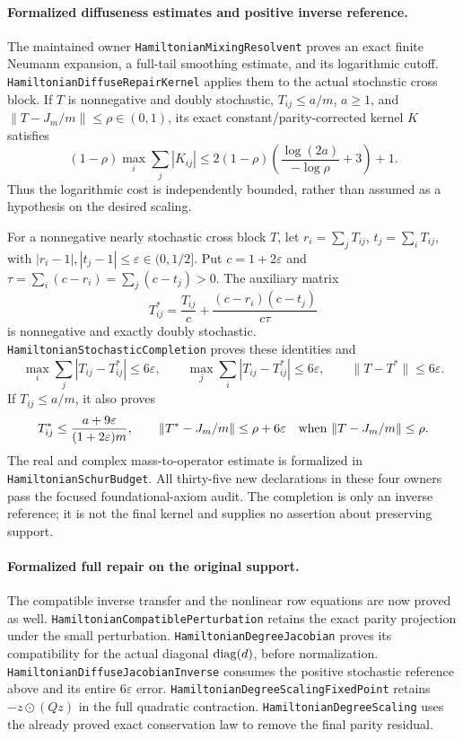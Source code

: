 \paragraph{Formalized diffuseness estimates and positive inverse reference.}
The maintained owner \texttt{HamiltonianMixingResolvent} proves
an exact finite Neumann expansion, a full-tail smoothing estimate,
and its logarithmic cutoff.
\texttt{HamiltonianDiffuseRepairKernel} applies them to the actual
stochastic cross block. If \(T\) is nonnegative and doubly stochastic,
\(T_{ij}\leq a/m\), \(a\geq1\), and
\(\|T-J_m/m\|\leq\rho\in(0,1)\), its exact
constant/parity-corrected kernel \(K\) satisfies
\[
 (1-\rho)\max_i\sum_j|K_{ij}|
 \leq
 2(1-\rho)\left(\frac{\log(2a)}{-\log\rho}+3\right)+1.
\]
Thus the logarithmic cost is independently bounded, rather than
assumed as a hypothesis on the desired scaling.

For a nonnegative nearly stochastic cross block \(T\), let
\(r_i=\sum_jT_{ij}\), \(t_j=\sum_iT_{ij}\), with
\(|r_i-1|,|t_j-1|\leq\varepsilon\in(0,1/2]\).
Put \(c=1+2\varepsilon\) and
\(\tau=\sum_i(c-r_i)=\sum_j(c-t_j)>0\). The auxiliary matrix
\[
 T^*_{ij}=\frac{T_{ij}}c+
               \frac{(c-r_i)(c-t_j)}{c\tau}
\]
is nonnegative and exactly doubly stochastic.
\texttt{HamiltonianStochasticCompletion} proves these identities and
\[
 \max_i\sum_j|T_{ij}-T^*_{ij}|\leq6\varepsilon,\qquad
 \max_j\sum_i|T_{ij}-T^*_{ij}|\leq6\varepsilon,\qquad
 \|T-T^*\|\leq6\varepsilon .
\]
If \(T_{ij}\leq a/m\), it also proves
\[
 T^*_{ij}\leq\frac{a+9\varepsilon}{(1+2\varepsilon)m},
 \qquad
 \|T^*-J_m/m\|\leq\rho+6\varepsilon
 \quad\hbox{when }\|T-J_m/m\|\leq\rho.
\]
The real and complex mass-to-operator estimate is formalized in
\texttt{HamiltonianSchurBudget}.
All thirty-five new declarations in these four owners pass the
focused foundational-axiom audit.
The completion is only an inverse reference; it is not the final
kernel and supplies no assertion about preserving support.
\paragraph{Formalized full repair on the original support.}
The compatible inverse transfer and the nonlinear row equations
are now proved as well.
\texttt{HamiltonianCompatiblePerturbation} retains the exact parity
projection under the small perturbation.
\texttt{HamiltonianDegreeJacobian} proves its compatibility for
the actual diagonal \(\operatorname{diag}(d)\), before normalization.
\texttt{HamiltonianDiffuseJacobianInverse} consumes the positive
stochastic reference above and its entire \(6\varepsilon\) error.
\texttt{HamiltonianDegreeScalingFixedPoint} retains
\(-z\mathbin{\odot}(Qz)\) in the full quadratic contraction.
\texttt{HamiltonianDegreeScaling} uses the already proved exact
conservation law to remove the final parity residual.

